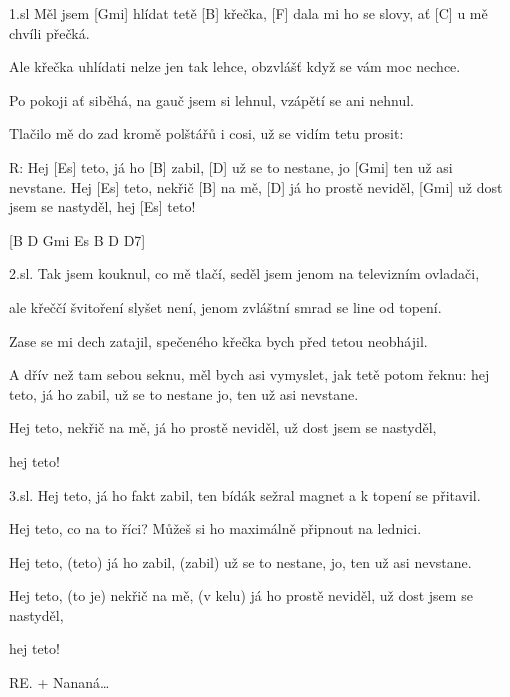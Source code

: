 
1.sl
Měl jsem [Gmi] hlídat 
tetě [B] křečka, 
[F] dala mi ho se slovy, ať 
[C] u mě chvíli přečká. 

Ale křečka 
uhlídati 
nelze jen tak lehce, obzvlášť 
když se vám moc nechce. 

Po pokoji 
ať siběhá, 
na gauč jsem si lehnul, 
vzápětí se ani nehnul. 

Tlačilo mě 
do zad kromě 
polštářů i cosi, 
už se vidím tetu prosit: 

R:
Hej [Es] teto, 
já ho [B] zabil, 
[D] už se to nestane, jo 
[Gmi] ten už asi nevstane. 
\columnbreak
Hej [Es] teto, 
nekřič [B] na mě, 
[D] já ho prostě neviděl, 
[Gmi] už dost jsem se nastyděl, 
hej [Es] teto! 

[B D Gmi Es B D D7] 

2.sl. 
Tak jsem kouknul, 
co mě tlačí, 
seděl jsem jenom na televizním ovladači, 

ale křeččí 
švitoření 
slyšet není, 
jenom zvláštní smrad se line od topení. 

Zase se mi 
dech zatajil, 
spečeného křečka bych před tetou neobhájil. 

A dřív než tam 
sebou seknu, 
měl bych asi vymyslet, 
jak tetě potom řeknu: 
\columnbreak
hej teto, 
já ho zabil, 
už se to nestane 
jo, ten už asi nevstane. 

Hej teto, 
nekřič na mě, 
já ho prostě neviděl, 
už dost jsem se nastyděl, 

hej teto! 

3.sl. 
Hej teto, 
já ho fakt zabil, 
ten bídák sežral magnet 
a k topení se přitavil. 

Hej teto, 
co na to říci? 
Můžeš si ho maximálně připnout na lednici. 

Hej teto, (teto) 
já ho zabil, (zabil) 
už se to nestane, 
jo, ten už asi nevstane. 

Hej teto, (to je) 
nekřič na mě, (v kelu) 
já ho prostě neviděl, 
už dost jsem se nastyděl, 

hej teto!


RE. + Nananá…
